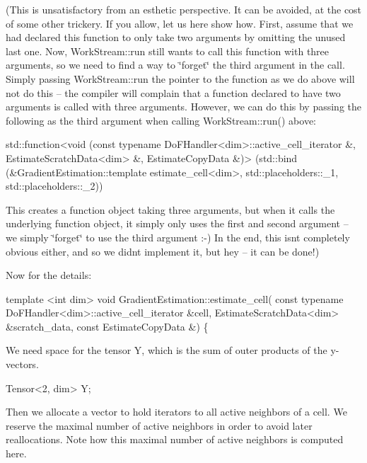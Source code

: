 (This is unsatisfactory from an esthetic perspective. It can be avoided, at the cost of some other trickery. If you allow, let us here show how. First, assume that we had declared this function to only take two arguments by omitting the unused last one. Now, Work\+Stream\+::run still wants to call this function with three arguments, so we need to find a way to \char`\"{}forget\char`\"{} the third argument in the call. Simply passing Work\+Stream\+::run the pointer to the function as we do above will not do this -- the compiler will complain that a function declared to have two arguments is called with three arguments. However, we can do this by passing the following as the third argument when calling Work\+Stream\+::run() above\+:  
\begin{DoxyCode}
std::function<void (const typename DoFHandler<dim>::active\_cell\_iterator
&,
                    EstimateScratchData<dim>                  &,
                    EstimateCopyData                          &)>
  (std::bind (&GradientEstimation::template estimate\_cell<dim>,
              std::placeholders::\_1,
              std::placeholders::\_2))
\end{DoxyCode}
  This creates a function object taking three arguments, but when it calls the underlying function object, it simply only uses the first and second argument -- we simply \char`\"{}forget\char`\"{} to use the third argument \+:-\/) In the end, this isn\textquotesingle{}t completely obvious either, and so we didn\textquotesingle{}t implement it, but hey -- it can be done!)

Now for the details\+:


\begin{DoxyCode}
\textcolor{keyword}{template} <\textcolor{keywordtype}{int} dim>
\textcolor{keywordtype}{void} GradientEstimation::estimate\_cell(
    \textcolor{keyword}{const} \textcolor{keyword}{typename} DoFHandler<dim>::active\_cell\_iterator &cell,
    EstimateScratchData<dim> &scratch\_data, \textcolor{keyword}{const} EstimateCopyData &)
\{
\end{DoxyCode}


We need space for the tensor {\ttfamily Y}, which is the sum of outer products of the y-\/vectors.


\begin{DoxyCode}
Tensor<2, dim> Y;
\end{DoxyCode}


Then we allocate a vector to hold iterators to all active neighbors of a cell. We reserve the maximal number of active neighbors in order to avoid later reallocations. Note how this maximal number of active neighbors is computed here.


